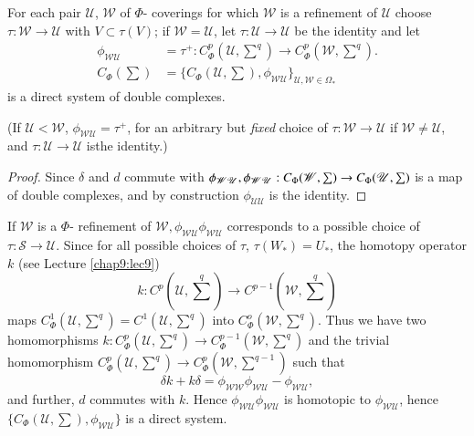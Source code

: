 For each pair $\mathscr{U}$, $\mathscr{W}$ of $\Phi$- coverings for
which $\mathscr{W}$ is a refinement of $\mathscr{U}$ choose $\tau :
\mathscr{W} \to \mathscr{U}$ with $V \subset \tau(V)$; if $\mathscr{W}
= \mathscr{U}$, let $\tau: \mathscr{U} \to \mathscr{U}$ be the
identity and let  
\begin{align*}
\phi_{\mathscr{W}\mathscr{U}} & = \tau^+ : C^p_{\Phi}(\mathscr{U},
\sum^q) \to C^p_{\Phi}\left(\mathscr{W}, \sum^q \right). \\
C_{\Phi}(\sum) & = \bigg\{ C_{\Phi} \left(\mathscr{U},
\sum \right),\phi_{\mathscr{W}\mathscr{U}} \bigg\}_{\mathscr{U},\mathscr{W}
  \in \Omega_\ast} 
\end{align*}
is a direct system of double complexes. 

(If $\mathscr{U} < \mathscr{W}$, $\phi_{\mathscr{W}\mathscr{U}}= 
\tau^+$, for an arbitrary but \textit{fixed} choice of $\tau : 
\mathscr{W} \to \mathscr{U}$ if $\mathscr{W} \neq \mathscr{U}$, and
$\tau: \mathscr{U} \to \mathscr{U}$ is\pageoriginale the identity.) 

\begin{proof}
Since $\delta$ and $d$ commute with $\phi_{\mathscr{W}\mathscr{U}},
\phi_{\mathscr{W}\mathscr{U}}: C_{\Phi}(\mathscr{W}, \sum) \to\break
C_{\Phi}(\mathscr{U},\sum)$ is a map of double complexes, and by
construction $\phi_{\mathscr{U} \mathscr{U}}$ is the identity. 
\end{proof}

If $\mathscr{W}$ is a $\Phi$- refinement of $\mathscr{W},
\phi_{\mathscr{W}\mathscr{U}} \phi_{\mathscr{W}\mathscr{U}}$
corresponds to a possible choice of $\tau : \mathscr{S} \to
\mathscr{U}$. Since for all possible choices of $\tau$, $\tau(W_\ast) =
U_\ast$, the homotopy operator $k$ (see Lecture \ref{chap9:lec9}) 
$$
k: C^p \left(\mathscr{U}, \sum^q \right) \to C^{p-1}
\left(\mathscr{W}, \sum^q\right)  
$$
maps $C^1_{\Phi} \left(\mathscr{U}, \sum^q \right) =C^1 \left(\mathscr{U},
\sum^q \right)$ into $C^o_{\Phi} \left(\mathscr{W}, \sum^q
\right)$. Thus we have two homomorphisms $k : 
 C^p_{\Phi} \left(\mathscr{U}, \sum^q \right) \to C^{p-1}_{\Phi}
 \left(\mathscr{W},\sum^q \right)$ and the trivial homomorphism
 $C^{p}_{\Phi} \left(\mathscr{U}, \sum^q \right) \to
 C^{p}_{\Phi} \left(\mathscr{W}, \sum^{q-1} \right)$ such that   
$$
\delta k + k \delta = \phi_{\mathscr{W} \mathscr{W}}
\phi_{\mathscr{W}\mathscr{U}}- \phi_{\mathscr{W} \mathscr{U}}, 
$$
and further, $d$ commutes with $k$. Hence $\phi_{\mathscr{W}
  \mathscr{U}} \phi_{\mathscr{W} \mathscr{U}}$ is homotopic to
$\phi_{\mathscr{W} \mathscr{U}}$, hence $\bigg\{ C_{\Phi}(\mathscr{U}
,\sum), \phi_{\mathscr{W} \mathscr{U}} \bigg\}$ is a direct system. 

